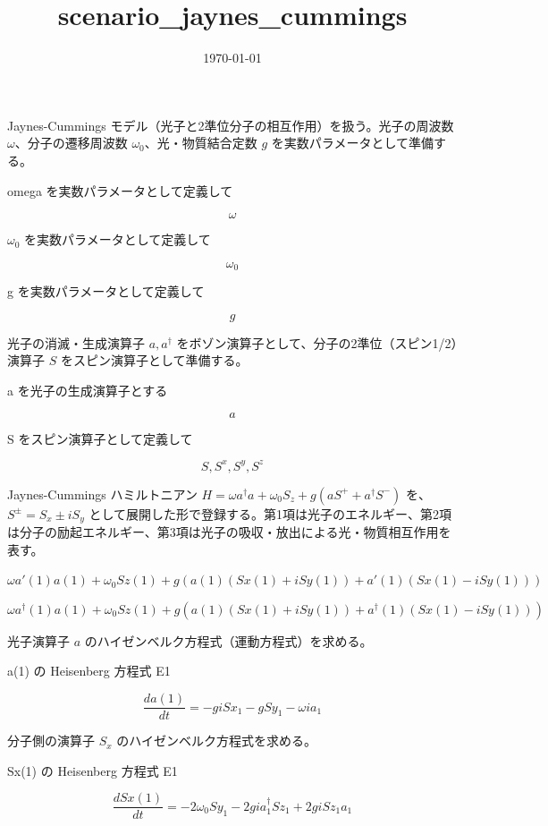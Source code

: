\documentclass[dvipdfmx,a4paper,11pt]{jsarticle}
\title{scenario\_jaynes\_cummings}
\date{\today}
\begin{document}
\maketitle

Jaynes-Cummings モデル（光子と2準位分子の相互作用）を扱う。光子の周波数 $\omega$、分子の遷移周波数 $\omega_0$、光・物質結合定数 $g$ を実数パラメータとして準備する。

omega を実数パラメータとして定義して

\[
  \omega
\]

$\omega_0$ を実数パラメータとして定義して

\[
  \omega_{0}
\]

g を実数パラメータとして定義して

\[
  g
\]

光子の消滅・生成演算子 $a,a^\dagger$ をボゾン演算子として、分子の2準位（スピン1/2）演算子 $S$ をスピン演算子として準備する。

a を光子の生成演算子とする

\[
  a
\]

S をスピン演算子として定義して

\[
  S, S^{x}, S^{y}, S^{z}
\]

Jaynes-Cummings ハミルトニアン $H=\omega a^\dagger a+\omega_0S_z+g(aS^++a^\dagger S^-)$ を、$S^\pm=S_x\pm iS_y$ として展開した形で登録する。第1項は光子のエネルギー、第2項は分子の励起エネルギー、第3項は光子の吸収・放出による光・物質相互作用を表す。

$\omega a'(1) a(1) + \omega_0 Sz(1) + g (a(1) (Sx(1) + i Sy(1)) + a'(1) (Sx(1) - i Sy(1)))$

\begin{equation}
  \omega a^{\dagger}(1) a(1) + \omega_0 Sz(1) + g (a(1) (Sx(1) + i Sy(1)) + a^{\dagger}(1) (Sx(1) - i Sy(1)))
  \label{eq:E1}
\end{equation}

光子演算子 $a$ のハイゼンベルク方程式（運動方程式）を求める。

a(1) の Heisenberg 方程式 E1

\begin{equation}
  \frac{d a(1)}{d t} = - g \mathit{i} Sx_1 - g Sy_1 - \omega \mathit{i} {a}_{1}
  \label{eq:E2}
\end{equation}

分子側の演算子 $S_x$ のハイゼンベルク方程式を求める。

Sx(1) の Heisenberg 方程式 E1

\begin{equation}
  \frac{d Sx(1)}{d t} = - 2 \omega_{0} Sy_1 - 2 g \mathit{i} {a}_{1}^{\dagger} Sz_1 + 2 g \mathit{i} Sz_1 {a}_{1}
  \label{eq:E3}
\end{equation}
\end{document}
